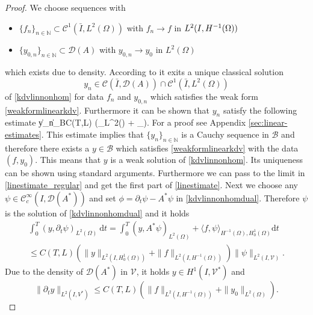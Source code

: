 \begin{proof}
We choose sequences with
\begin{itemize}
  \item $\{f_n\}_{n\in\mathbb{N}}\subset\mathcal C^1(\bar I,L^2(\Omega))$ with $f_n\rightarrow f$ in $\Hm1$
  \item $\{y_{0,n}\}_{n\in\mathbb{N}}\subset\mathcal D(A)$ with $y_{0,n}\rightarrow y_0$ in $L^2(\Omega)$
\end{itemize}
which exists due to density. According to \cite[Part 2, Proposition 3.3]{bensoussan07} it exits a unique classical solution
\[y_n\in \mathcal C(\bar I,\mathcal D(A))\cap \mathcal C^1(\bar I,L^2(\Omega))\]
of \eqref{kdvlinnonhom} for data $f_n$ and $y_{0,n}$ which satisfies the weak form \eqref{weakformlinearkdv}. Furthermore it can be shown that $y_n$ satisfy the following estimate
\be
  \|y_n\|_{\mathcal B}\leq C(T,L) \left(_{L^{2}(\Omega)} + _{}\right).
  \label{linestimate_regular}
\ee
For a proof see Appendix \ref{sec:linear-estimates}.  This estimate implies that $\{y_n\}_{n\in \mathbb{N}}$ is a Cauchy sequence in $\mathcal B$ and therefore there exists a $y\in \mathcal B$ which satisfies \eqref{weakformlinearkdv} with the data $(f,y_0)$. This means that $y$ is a weak solution of \eqref{kdvlinnonhom}. Its uniqueness can be shown using standard arguments. Furthermore we can  pass to the limit in \eqref{linestimate_regular} and get the first part of \eqref{linestimate}. Next we choose any $\psi\in \mathcal C_c^{\infty}(I,\mathcal D(A^*))$ and set $\phi=\partial_t\psi-A^*\psi$ in \eqref{kdvlinnonhomdual}. Therefore $\psi$ is the solution of \eqref{kdvlinnonhomdual} and it holds
\begin{multline*}
\int_0^T(y,\partial_t\psi)_{L^2(\Omega)}~\mathrm dt=\int_0^T(y,A^*\psi)_{L^2(\Omega)}+\langle f,\psi\rangle_{H^{-1}(\Omega),H^1_0(\Omega)}\mathrm dt\\
\leq C(T,L)\left(\|y\|_{L^2(I,H^1_0(\Omega))}+\|f\|_{L^2(I,H^{-1}(\Omega))}\right)\|\psi\|_{L^2(I,\mathcal V)}.
\end{multline*}
Due to the density of $\mathcal D(A^*)$ in $\mathcal V$, it holds $y\in H^1(I,\mathcal V^*)$ and
\[\|\partial_t y\|_{L^2(I,V^*)}\leq C(T,L)\left(\|f\|_{L^2(I,H^{-1}(\Omega))}+\|y_0\|_{L^2(\Omega)}\right).\]
\end{proof}



